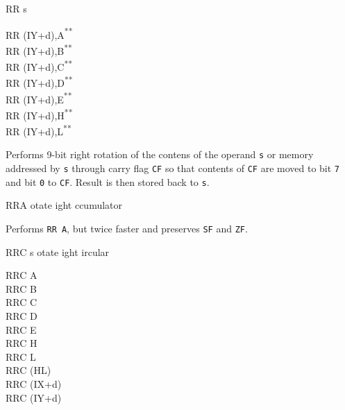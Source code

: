 \documentclass[12pt,twoside,openright,a4paper]{book}
\newcommand{\UNDOC}{\textnormal{\textsuperscript{**}}}
\begin{document}
\begin{basedescript}{
	\desclabelstyle{\multilinelabel}
	\desclabelwidth{3cm}}
\begin{DetailItem}{RR s}
\begin{DetailVariants}
			\columnbreak
			RR (IY+d),A\UNDOC\\
			RR (IY+d),B\UNDOC\\
			RR (IY+d),C\UNDOC\\
			RR (IY+d),D\UNDOC\\
			RR (IY+d),E\UNDOC\\
			RR (IY+d),H\UNDOC\\
			RR (IY+d),L\UNDOC
		\end{DetailVariants}

		Performs 9-bit right rotation of the contens of the operand {\tt s} or memory addressed by {\tt s} through carry flag {\tt CF} so that contents of {\tt CF} are moved to bit {\tt 7} and bit {\tt 0} to {\tt CF}. Result is then stored back to {\tt s}.

		\begin{DetailEffects}[p]
			\FlagsRRr
		\end{DetailEffects}
						
		\begin{DetailTiming}
		\end{DetailTiming}

	\end{DetailItem}

	\begin{DetailItem}{RRA}
		{otate ight ccumulator}
		{\SymRR{A}}

		Performs {\tt RR A}, but twice faster and preserves {\tt SF} and {\tt ZF}.

		\begin{DetailEffects}
			\FlagsRRA
		\end{DetailEffects}
						
		\begin{DetailTiming}
			\DetailTime{}{1}{4}
		\end{DetailTiming}

	\end{DetailItem}

	\pagebreak
	\begin{DetailItem}{RRC s}
		{otate ight ircular}
		{\SymRRC{s}}

		\begin{DetailVariants}
			RRC A\\
			RRC B\\
			RRC C\\
			RRC D\\
			RRC E\\
			RRC H\\
			RRC L\\
			RRC (HL)\\
			RRC (IX+d)\\
			RRC (IY+d)


\end{DetailVariants}
\end{DetailItem}
\end{basedescript}
\end{document}
